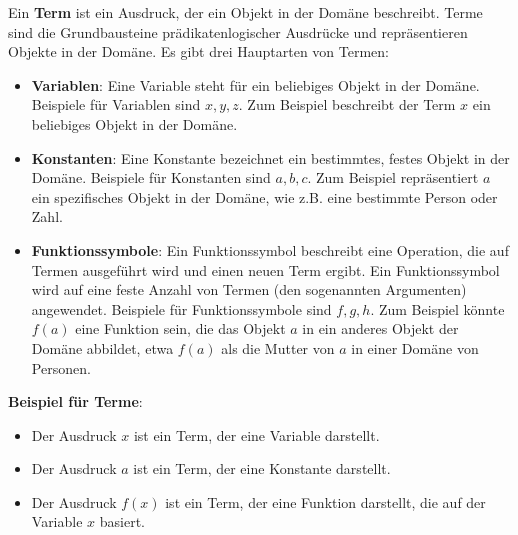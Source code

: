 \documentclass[main.tex]{subfiles}
\begin{document}
\begin{definition}[Term]
Ein \textbf{Term} ist ein Ausdruck, der ein Objekt in der Domäne beschreibt. Terme sind die Grundbausteine prädikatenlogischer Ausdrücke und repräsentieren Objekte in der Domäne. Es gibt drei Hauptarten von Termen:

\begin{itemize}
    \item \textbf{Variablen}: Eine Variable steht für ein beliebiges Objekt in der Domäne. Beispiele für Variablen sind \(x, y, z\). Zum Beispiel beschreibt der Term \(x\) ein beliebiges Objekt in der Domäne.

    \item \textbf{Konstanten}: Eine Konstante bezeichnet ein bestimmtes, festes Objekt in der Domäne. Beispiele für Konstanten sind \(a, b, c\). Zum Beispiel repräsentiert \(a\) ein spezifisches Objekt in der Domäne, wie z.B. eine bestimmte Person oder Zahl.

    \item \textbf{Funktionssymbole}: Ein Funktionssymbol beschreibt eine Operation, die auf Termen ausgeführt wird und einen neuen Term ergibt. Ein Funktionssymbol wird auf eine feste Anzahl von Termen (den sogenannten Argumenten) angewendet. Beispiele für Funktionssymbole sind \(f, g, h\). Zum Beispiel könnte \(f(a)\) eine Funktion sein, die das Objekt \(a\) in ein anderes Objekt der Domäne abbildet, etwa \(f(a)\) als die Mutter von \(a\) in einer Domäne von Personen.
\end{itemize}

\textbf{Beispiel für Terme}:
\begin{itemize}
    \item Der Ausdruck \(x\) ist ein Term, der eine Variable darstellt.
    \item Der Ausdruck \(a\) ist ein Term, der eine Konstante darstellt.
    \item Der Ausdruck \(f(x)\) ist ein Term, der eine Funktion darstellt, die auf der Variable \(x\) basiert.
\end{itemize}

\end{definition}
\end{document}
